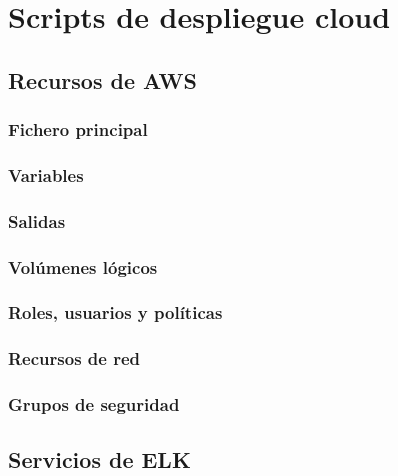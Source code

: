 \chapter{Scripts de despliegue cloud}\label{anexo:cloud}
\section{Recursos de AWS}
\subsection{Fichero principal}

\subsection{Variables}

\subsection{Salidas}

\subsection{Volúmenes lógicos}

\subsection{Roles, usuarios y políticas}

\subsection{Recursos de red}

\subsection{Grupos de seguridad}


\section{Servicios de ELK}
